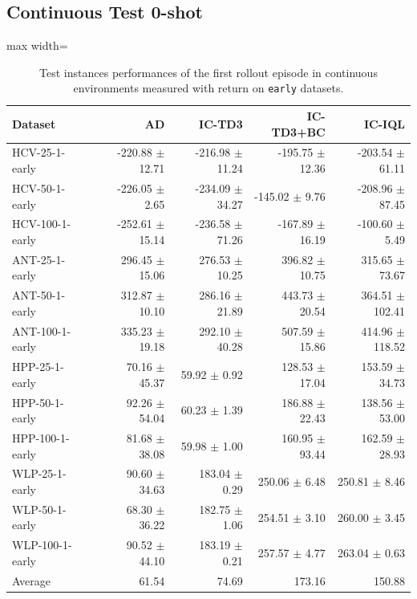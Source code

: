 \documentclass{article}
\begin{document}
\subsection{Continuous Test 0-shot}
\begin{table}[ht]
    \label{tab:}
    \begin{center}
    \caption{Test instances performances of the first rollout episode in continuous environments measured with return on \texttt{early} datasets.}
    \begin{small}
    \begin{adjustbox}{max width=\columnwidth}
		\begin{tabular}{l|rrrr}
		\toprule
	\textbf{Dataset} & \textbf{AD} & \textbf{IC-TD3} & \textbf{IC-TD3+BC} & \textbf{IC-IQL}\\
\midrule
HCV-25-1-early & -220.88 $\pm$ 12.71 & -216.98 $\pm$ 11.24 & -195.75 $\pm$ 12.36 & -203.54 $\pm$ 61.11\\
HCV-50-1-early & -226.05 $\pm$ 2.65 & -234.09 $\pm$ 34.27 & -145.02 $\pm$ 9.76 & -208.96 $\pm$ 87.45\\
HCV-100-1-early & -252.61 $\pm$ 15.14 & -236.58 $\pm$ 71.26 & -167.89 $\pm$ 16.19 & -100.60 $\pm$ 5.49\\
ANT-25-1-early & 296.45 $\pm$ 15.06 & 276.53 $\pm$ 10.25 & 396.82 $\pm$ 10.75 & 315.65 $\pm$ 73.67\\
ANT-50-1-early & 312.87 $\pm$ 10.10 & 286.16 $\pm$ 21.89 & 443.73 $\pm$ 20.54 & 364.51 $\pm$ 102.41\\
ANT-100-1-early & 335.23 $\pm$ 19.18 & 292.10 $\pm$ 40.28 & 507.59 $\pm$ 15.86 & 414.96 $\pm$ 118.52\\
HPP-25-1-early & 70.16 $\pm$ 45.37 & 59.92 $\pm$ 0.92 & 128.53 $\pm$ 17.04 & 153.59 $\pm$ 34.73\\
HPP-50-1-early & 92.26 $\pm$ 54.04 & 60.23 $\pm$ 1.39 & 186.88 $\pm$ 22.43 & 138.56 $\pm$ 53.00\\
HPP-100-1-early & 81.68 $\pm$ 38.08 & 59.98 $\pm$ 1.00 & 160.95 $\pm$ 93.44 & 162.59 $\pm$ 28.93\\
WLP-25-1-early & 90.60 $\pm$ 34.63 & 183.04 $\pm$ 0.29 & 250.06 $\pm$ 6.48 & 250.81 $\pm$ 8.46\\
WLP-50-1-early & 68.30 $\pm$ 36.22 & 182.75 $\pm$ 1.06 & 254.51 $\pm$ 3.10 & 260.00 $\pm$ 3.45\\
WLP-100-1-early & 90.52 $\pm$ 44.10 & 183.19 $\pm$ 0.21 & 257.57 $\pm$ 4.77 & 263.04 $\pm$ 0.63\\
\midrule
Average & 61.54 & 74.69 & 173.16 & 150.88\\
\end{tabular}
        \end{adjustbox}
    \end{small}
    \end{center}
    \vskip -0.1in
\end{table}
\end{document}
